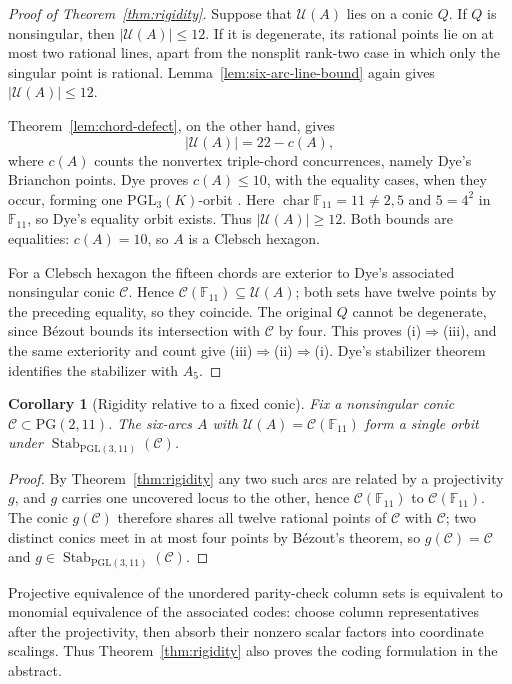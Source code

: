 \documentclass[11pt]{article}
\newtheorem{corollary}[theorem]{Corollary}
\theoremstyle{definition}
\theoremstyle{remark}
\newcommand{\PG}{\mathrm{PG}}
\newcommand{\F}{\mathbb{F}}
\newcommand{\cC}{\mathcal{C}}
\newcommand{\cU}{\mathcal{U}}
\begin{document}
\begin{proof}[Proof of Theorem~\ref{thm:rigidity}]
Suppose that $\cU(A)$ lies on a conic $Q$.  If $Q$ is nonsingular, then
$|\cU(A)|\le12$.  If it is degenerate, its rational points lie on at most
two rational lines, apart from the nonsplit rank-two case in which only the
singular point is rational.  Lemma~\ref{lem:six-arc-line-bound} again gives
$|\cU(A)|\le12$.

Theorem~\ref{lem:chord-defect}, on the other hand, gives
\[
 |\cU(A)|=22-c(A),
\]
where $c(A)$ counts the nonvertex triple-chord concurrences, namely Dye's
Brianchon points.  Dye proves $c(A)\le10$, with the equality cases, when
they occur, forming one $\mathrm{PGL}_3(K)$-orbit
\cite[\S2.2--2.3, Theorem~1,
pp.~275--276]{Dye1991}. Here $\operatorname{char}\F_{11}=11\ne2,5$ and
$5=4^2$ in $\F_{11}$, so Dye's equality orbit exists. Thus
$|\cU(A)|\ge12$. Both bounds are equalities:
$c(A)=10$, so $A$ is a Clebsch hexagon.

For a Clebsch hexagon the fifteen chords are exterior to Dye's associated
nonsingular conic $\cC$.  Hence $\cC(\F_{11})\subseteq\cU(A)$; both sets
have twelve points by the preceding equality, so they coincide.  The
original $Q$ cannot be degenerate, since B\'ezout bounds its intersection
with $\cC$ by four.  This proves (i)$\Rightarrow$(iii), and the same
exteriority and count give (iii)$\Rightarrow$(ii)$\Rightarrow$(i).
Dye's stabilizer theorem identifies the stabilizer with $A_5$.
\end{proof}

\begin{corollary}[Rigidity relative to a fixed conic]
\label{cor:conic-stabilizer-orbit}
Fix a nonsingular conic $\cC\subset\PG(2,11)$.  The six-arcs $A$ with
$\cU(A)=\cC(\F_{11})$ form a single orbit under
$\operatorname{Stab}_{\mathrm{PGL}(3,11)}(\cC)$.
\end{corollary}

\begin{proof}
By Theorem~\ref{thm:rigidity} any two such arcs are related by a
projectivity $g$, and $g$ carries one uncovered locus to the other, hence
$\cC(\F_{11})$ to $\cC(\F_{11})$.  The conic $g(\cC)$ therefore shares all
twelve rational points of $\cC$ with $\cC$; two distinct conics meet in at
most four points by B\'ezout's theorem, so $g(\cC)=\cC$ and
$g\in\operatorname{Stab}_{\mathrm{PGL}(3,11)}(\cC)$.
\end{proof}

Projective equivalence of the unordered parity-check column sets is
equivalent to monomial equivalence of the associated codes: choose column
representatives after the projectivity, then absorb their nonzero scalar
factors into coordinate scalings.  Thus Theorem~\ref{thm:rigidity} also
proves the coding formulation in the abstract.
\end{document}
